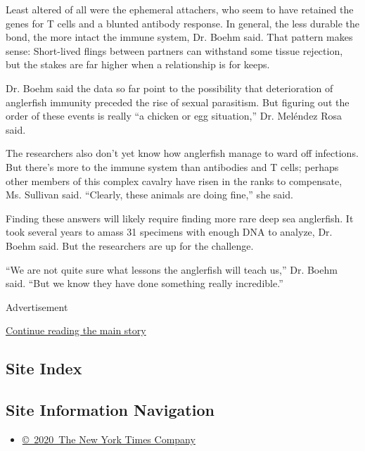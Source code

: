 Least altered of all were the ephemeral attachers, who seem to have
retained the genes for T cells and a blunted antibody response. In
general, the less durable the bond, the more intact the immune system,
Dr. Boehm said. That pattern makes sense: Short-lived flings between
partners can withstand some tissue rejection, but the stakes are far
higher when a relationship is for keeps.

Dr. Boehm said the data so far point to the possibility that
deterioration of anglerfish immunity preceded the rise of sexual
parasitism. But figuring out the order of these events is really ``a
chicken or egg situation,'' Dr. Meléndez Rosa said.

The researchers also don't yet know how anglerfish manage to ward off
infections. But there's more to the immune system than antibodies and T
cells; perhaps other members of this complex cavalry have risen in the
ranks to compensate, Ms. Sullivan said. ``Clearly, these animals are
doing fine,'' she said.

Finding these answers will likely require finding more rare deep sea
anglerfish. It took several years to amass 31 specimens with enough DNA
to analyze, Dr. Boehm said. But the researchers are up for the
challenge.

``We are not quite sure what lessons the anglerfish will teach us,'' Dr.
Boehm said. ``But we know they have done something really incredible.''

Advertisement

\protect\hyperlink{after-bottom}{Continue reading the main story}

\hypertarget{site-index}{%
\subsection{Site Index}\label{site-index}}

\hypertarget{site-information-navigation}{%
\subsection{Site Information
Navigation}\label{site-information-navigation}}

\begin{itemize}
\tightlist
\item
  \href{https://help.nytimes3xbfgragh.onion/hc/en-us/articles/115014792127-Copyright-notice}{©~2020~The
  New York Times Company}
\end{itemize}


